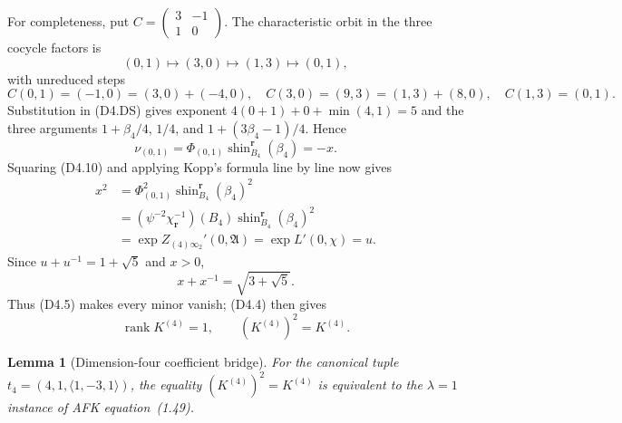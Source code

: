 \documentclass[11pt]{article}
\newtheorem{lemma}[theorem]{Lemma}
\begin{document}
For completeness, put
$C=\left(\begin{smallmatrix}3&-1\\1&0\end{smallmatrix}\right)$.
The characteristic orbit in the three cocycle factors is
\[
 (0,1)\longmapsto(3,0)\longmapsto(1,3)\longmapsto(0,1),
\]
with unreduced steps
\[
 C(0,1)=(-1,0)=(3,0)+(-4,0),\quad
 C(3,0)=(9,3)=(1,3)+(8,0),\quad
 C(1,3)=(0,1).
\]
Substitution in \textup{(D4.DS)} gives exponent
$4(0+1)+0+\min(4,1)=5$ and the three arguments
$1+\beta_4/4$, $1/4$, and $1+(3\beta_4-1)/4$.  Hence
\[
 \nu_{(0,1)}
 =\Phi_{(0,1)}
  \operatorname{shin}^{\boldsymbol r}_{B_4}(\beta_4)=-x.
\tag{D4.10}
\]
Squaring \textup{(D4.10)} and applying Kopp's formula line by line now
gives
\[
\begin{split}
 x^2
 &=\Phi_{(0,1)}^2
   \operatorname{shin}^{\boldsymbol r}_{B_4}(\beta_4)^2\\
 &=(\psi^{-2}\chi_{\boldsymbol r}^{-1})(B_4)
   \operatorname{shin}^{\boldsymbol r}_{B_4}(\beta_4)^2\\
 &=\exp Z_{(4)\infty_2}'(0,\mathfrak A)
  =\exp L'(0,\chi)=u.
\end{split}
\tag{D4.11}
\]
Since $u+u^{-1}=1+\sqrt5$ and $x>0$,
\[
 x+x^{-1}=\sqrt{3+\sqrt5}.
\]
Thus (D4.5) makes every minor vanish; (D4.4) then gives
\[
 \operatorname{rank}K^{(4)}=1,\qquad
 (K^{(4)})^2=K^{(4)}.
\tag{D4.12}
\]

\begin{lemma}[Dimension-four coefficient bridge]\label{lem:d4tcc}
For the canonical tuple
$t_4=(4,1,\langle1,-3,1\rangle)$, the equality
$(K^{(4)})^2=K^{(4)}$ is equivalent to the $\lambda=1$ instance of
AFK equation~(1.49).
\end{lemma}
\end{document}
